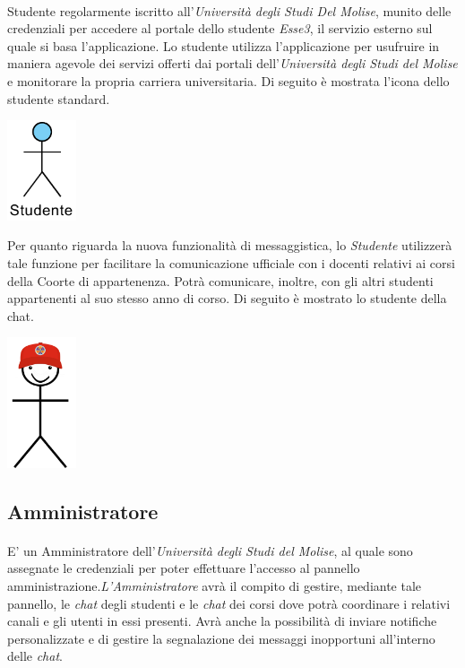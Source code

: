 \paragraph{} 
Studente regolarmente iscritto all’\textit{Università degli Studi Del Molise}, munito delle credenziali per accedere al portale dello studente \textit{Esse3}, il servizio esterno sul quale si basa l’applicazione. Lo studente utilizza l’applicazione per usufruire in maniera agevole dei servizi offerti dai portali dell’\textit{Università degli Studi del Molise} e monitorare la propria carriera universitaria. Di seguito è mostrata l'icona dello studente standard.
\begin{center}
	\includegraphics[width=0.8in]{imgs/attori/Attore-Studente.pdf}
\end{center}
Per quanto riguarda la nuova funzionalità di messaggistica, lo \textit{Studente} utilizzerà tale funzione per facilitare la comunicazione ufficiale con i docenti relativi ai corsi della Coorte di appartenenza. Potrà comunicare, inoltre, con gli altri studenti appartenenti al suo stesso anno di corso. Di seguito è mostrato lo studente della chat.
\begin{center}
	\includegraphics[width=0.8in]{imgs/attori/Studente.png}
	\label{fig:Attore: Studente chat}
\end{center}

\subsection{Amministratore}
\paragraph{} 
E' un Amministratore dell’\emph{Università degli Studi del Molise}, al quale sono assegnate le credenziali per poter effettuare l’accesso al pannello amministrazione.\emph{L’Amministratore} avrà il compito di gestire, mediante tale pannello, le \emph{chat} degli studenti e le \emph{chat} dei corsi dove potrà coordinare i relativi canali e gli utenti in essi presenti.
Avrà anche la possibilità di inviare notifiche personalizzate e di gestire la segnalazione dei messaggi inopportuni all’interno delle \emph{chat}.

